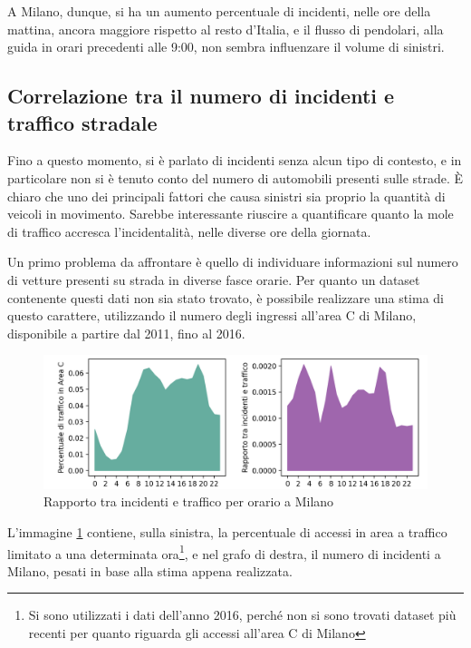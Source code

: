 \documentclass[a4paper,12pt]{report}
\begin{document}
A Milano, dunque, si ha un aumento percentuale di incidenti, nelle ore della mattina, 
ancora maggiore rispetto al resto d'Italia, e il flusso di pendolari, 
alla guida in orari precedenti alle 9:00, 
non sembra influenzare il volume di sinistri. 

\subsection{Correlazione tra il numero di incidenti e traffico stradale}

Fino a questo momento, si è parlato di incidenti senza alcun tipo di contesto, 
e in 
particolare non si è tenuto conto del numero di automobili presenti sulle strade. 
\`E chiaro che uno dei principali fattori che causa sinistri sia proprio 
la quantità di veicoli in movimento. 
Sarebbe interessante riuscire a quantificare quanto la mole di traffico accresca 
l'incidentalità, nelle diverse ore della giornata.

Un primo problema da affrontare è quello di individuare informazioni sul 
numero di vetture presenti su strada in diverse fasce orarie. 
Per quanto un dataset contenente questi dati non sia stato trovato, 
è possibile realizzare una stima di questo carattere, 
utilizzando il numero degli ingressi all'area C di Milano, 
disponibile a partire dal 2011, fino al 2016. 

\begin{figure}
    \includegraphics[width=\linewidth]{../src/area_c/rapporto_orario.png}
    \caption{Rapporto tra incidenti e traffico per orario a Milano}
    \label{fig:rapporto-incidenti-traffico}
\end{figure}

L'immagine \ref{fig:rapporto-incidenti-traffico} contiene, sulla sinistra, 
la percentuale di accessi in area a traffico limitato a una determinata 
ora\footnote{Si sono utilizzati i dati dell'anno 2016, perché non si sono trovati 
dataset più recenti per quanto riguarda gli accessi all'area C di Milano}, 
e nel grafo di destra, il numero di incidenti a Milano, pesati in base alla 
stima appena realizzata. 
\end{document}
